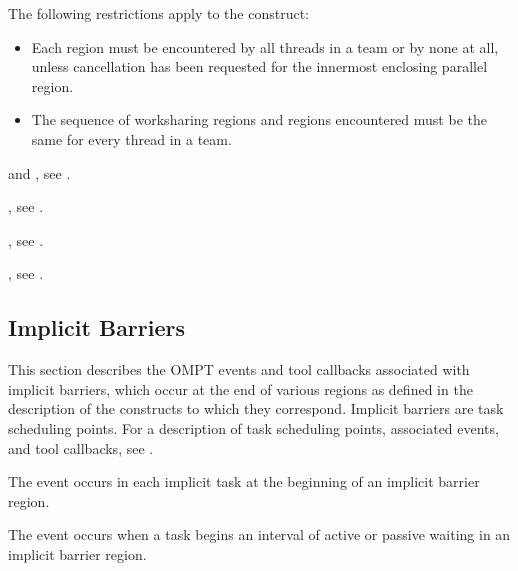 \restrictions
The following restrictions apply to the  construct:

\begin{itemize}
\item Each  region must be encountered by all threads in a team 
      or by none at all, unless cancellation has been requested for the innermost 
      enclosing parallel region.
\item The sequence of worksharing regions and  regions encountered 
      must be the same for every thread in a team.
\end{itemize}

\begin{crossrefs}
\item {} and , see
.

\item {}, see
.

\item {}, see
.

\item {}, see
.
\end{crossrefs}



\subsection{Implicit Barriers}
\label{subsec:implict-barrier}

This section describes the OMPT events and tool callbacks associated 
with implicit barriers, which occur at the end of various regions as
defined in the description of the constructs to which they correspond.
Implicit barriers are task scheduling points. For a description of
task scheduling points, associated events, and tool callbacks, see
.

\events

The  event occurs in each implicit task
at the beginning of an implicit barrier region.

The  event occurs when a task begins an interval of
active or passive waiting in an implicit barrier region.

